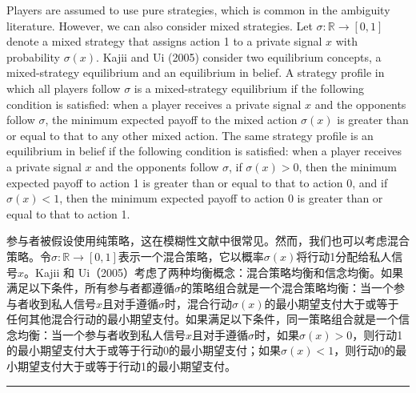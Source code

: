 \documentclass[12pt,a4paper]{article}
\newenvironment{original}
  {\par\medskip\noindent\color{black}\ignorespaces}
  {\par\medskip}
\newenvironment{translation}
  {\par\noindent\color{darkblue}\ignorespaces}
  {\par\medskip\noindent\hrule\par\medskip}
\theoremstyle{definition}
\theoremstyle{remark}
\begin{document}
\begin{original}
Players are assumed to use pure strategies, which is common in the ambiguity literature. However, we can also consider mixed strategies. Let $\sigma \colon \mathbb{R} \to [0, 1]$ denote a mixed strategy that assigns action 1 to a private signal $x$ with probability $\sigma(x)$. Kajii and Ui (2005) consider two equilibrium concepts, a mixed-strategy equilibrium and an equilibrium in belief. A strategy profile in which all players follow $\sigma$ is a mixed-strategy equilibrium if the following condition is satisfied: when a player receives a private signal $x$ and the opponents follow $\sigma$, the minimum expected payoff to the mixed action $\sigma(x)$ is greater than or equal to that to any other mixed action. The same strategy profile is an equilibrium in belief if the following condition is satisfied: when a player receives a private signal $x$ and the opponents follow $\sigma$, if $\sigma(x) > 0$, then the minimum expected payoff to action 1 is greater than or equal to that to action 0, and if $\sigma(x) < 1$, then the minimum expected payoff to action 0 is greater than or equal to that to action 1.
\end{original}
\begin{translation}
参与者被假设使用纯策略，这在模糊性文献中很常见。然而，我们也可以考虑混合策略。令$\sigma \colon \mathbb{R} \to [0, 1]$表示一个混合策略，它以概率$\sigma(x)$将行动1分配给私人信号$x$。Kajii 和 Ui（2005）考虑了两种均衡概念：混合策略均衡和信念均衡。如果满足以下条件，所有参与者都遵循$\sigma$的策略组合就是一个混合策略均衡：当一个参与者收到私人信号$x$且对手遵循$\sigma$时，混合行动$\sigma(x)$的最小期望支付大于或等于任何其他混合行动的最小期望支付。如果满足以下条件，同一策略组合就是一个信念均衡：当一个参与者收到私人信号$x$且对手遵循$\sigma$时，如果$\sigma(x) > 0$，则行动1的最小期望支付大于或等于行动0的最小期望支付；如果$\sigma(x) < 1$，则行动0的最小期望支付大于或等于行动1的最小期望支付。
\end{translation}
\end{document}
